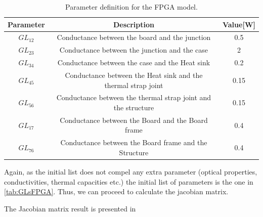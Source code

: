 \begin{table}[H]
\centering
\caption{Parameter definition for the FPGA model.}
\label{tab:GLsFPGA}

\begin{tabular}{c c c}
\toprule
\multicolumn{1}{c}{\textbf{Parameter}} & \multicolumn{1}{c}{\textbf{Description}} & \multicolumn{1}{c}{\textbf{Value}[W]} \\ \midrule
$GL_{12}$  & Conductance between the board and the junction  & 0.5 \\ 
$GL_{23}$  & Conductance between the junction and the case  &  2\\ 
$GL_{34}$  & Conductance between the case and the Heat sink  & 0.2 \\ 
$GL_{45}$  & Conductance between the Heat sink and the thermal strap joint  & 0.15 \\ 
$GL_{56}$  & Conductance between the thermal strap joint and the structure  & 0.15 \\ 
$GL_{17}$  & Conductance between the Board and the Board frame  & 0.4 \\ 
$GL_{76}$  & Conductance between the Board frame and the Structure  & 0.4 \\ \bottomrule
\end{tabular}
\end{table}

Again, as the initial list does not compel any extra parameter (optical properties, conductivities, thermal capacities etc.) the initial list of parameters is the one in \autoref{tab:GLsFPGA}. Thus, we can proceed to calculate the jacobian matrix.

The Jacobian matrix result is presented in 

